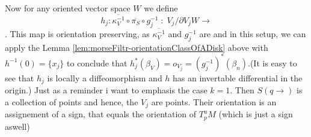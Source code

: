 \begin{definition}
	Now for any oriented vector space $W$ we define 
    \begin{equation*}
    h_j:\overline{\kappa_V^{-1}}\circ \overline{\pi_S}\circ g_j^{-1}\;:\;  
    V_j/\partial V_j  W  \to     
    \end{equation*}. This map is orientation preserving, as $\overline{\kappa_V^{-1}}$ and $g_j^{-1}$ are and in this setup, we can apply the Lemma \ref{lem:morseFiltr-orientationClassOfADisk} above with $h^{-1}(0)=\{x_j\}$ to conclude that $h^*_j(\beta_V)=o_{V_j}=(g_j^{-1})^*(\beta_n)$.(It is easy to see that $h_j$ is locally a diffeomorphism and $h$ has an invertable differential in the origin.) 
	Just as a reminder i want to emphasis the case $k=1$. Then $S(q\to)$ is a collection of points and hence, the $V_j$ are points. Their orientation is an assignement of a sign, that equals the orientation of $T^u_pM$ (which is just a sign aswell) 
\end{definition}

